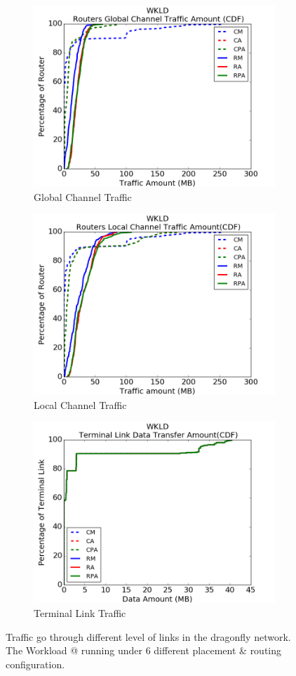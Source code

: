 \documentclass[conference,compsoc]{IEEEtran}
\makeatletter
\newcommand{\Rmnum}[1]{\expandafter\@slowromancap\romannumeral #1@}
\makeatother
\begin{document}
\begin{figure}[t!]
    \centering
    \begin{subfigure}[t]{0.32\textwidth}
        \centering
        \includegraphics[height=1.8 in]{wkld/gc-traffic}
        \caption{Global Channel Traffic}
        \label{fig:global-channel-traffic}
    \end{subfigure}%
    \hspace{1em}%
    \begin{subfigure}[t]{0.32\textwidth}
        \centering
        \includegraphics[height=1.8 in]{wkld/lc-traffic}
        \caption{Local Channel Traffic}
        \label{fig:local-channel-traffic}
    \end{subfigure}%
    \hspace{1em}%
    \begin{subfigure}[t]{0.32\textwidth}
        \centering
        \includegraphics[height=1.8 in]{wkld/tl-traffic}
        \caption{Terminal Link Traffic}
        \label{fig:terminal-link-traffic}
    \end{subfigure}%
  \caption{Traffic go through different level of links in the dragonfly network. The Workload \Rmnum{1} running under 6 different placement \& routing configuration. }
   \label{fig:wkld-network-traffic}
\end{figure}
\end{document}

